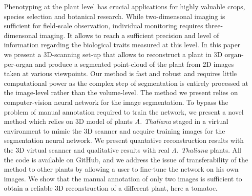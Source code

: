 Phenotyping at the plant level has crucial applications for highly valuable crops, species selection and botanical research. While two-dimensonal imaging is sufficient for field-scale observation, individual monitoring requires three-dimensonal imaging. It allows to reach a sufficient precision and level of information regarding the biological traits measured at this level. In this paper we present a 3D-scanning set-up that allows to reconstruct a plant in 3D organ-per-organ and produce a segmented point-cloud of the plant from 2D images taken at various viewpoints. Our method is fast and robust and requires little computational power as the complex step of segmentation is entirely processed at the image-level rather than the volume-level. The method we present relies on computer-vision neural network for the image segmentation. To bypass the problem of manual annotation required to train the network, we present a novel method which relies on 3D model of plants \emph{A. Thaliana} staged in a virtual environment to mimic the 3D scanner and acquire training images for the segmentation neural network. We present quantative reconstruction results with the 3D virtual scanner and qualitative results with real \emph{A. Thaliana} plants. All the code is available on GitHub, and we address the issue of transferability of the method to other plants by allowing a user to fine-tune the network on his own images. We show that the manual annotation of only two images is sufficient to obtain a reliable 3D reconstruction of a different plant, here a tomatoe.